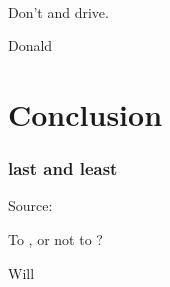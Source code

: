 \documentclass[aspectratio=169]{beamer}
\title{\deliv{\pp}{Presentation}}
\date{\datepp}
\begin{document}

\begin{frame}
\maketitle
\begin{center}
\names \\
\epigraph{Don't \tex{} and drive.}{Donald}
\end{center}
\end{frame}

\begin{frame}
\tableofcontents
\end{frame}







\section{Conclusion}
\frame{\sectionpage}

\begin{frame}
\frametitle{last and least}
Source: \crygithub
\epigraph{To \cry, or not to \cry?}{Will}
\end{frame}

\end{document}
